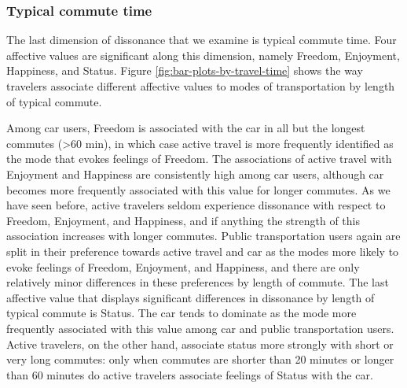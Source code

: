 \documentclass[]{elsarticle} %
\begin{document}
\hypertarget{typical-commute-time-1}{%
\subsubsection{Typical commute time}\label{typical-commute-time-1}}

The last dimension of dissonance that we examine is typical commute
time. Four affective values are significant along this dimension, namely
Freedom, Enjoyment, Happiness, and Status. Figure
\ref{fig:bar-plots-by-travel-time} shows the way travelers associate
different affective values to modes of transportation by length of
typical commute.

Among car users, Freedom is associated with the car in all but the
longest commutes (\textgreater60 min), in which case active travel is
more frequently identified as the mode that evokes feelings of Freedom.
The associations of active travel with Enjoyment and Happiness are
consistently high among car users, although car becomes more frequently
associated with this value for longer commutes. As we have seen before,
active travelers seldom experience dissonance with respect to Freedom,
Enjoyment, and Happiness, and if anything the strength of this
association increases with longer commutes. Public transportation users
again are split in their preference towards active travel and car as the
modes more likely to evoke feelings of Freedom, Enjoyment, and
Happiness, and there are only relatively minor differences in these
preferences by length of commute. The last affective value that displays
significant differences in dissonance by length of typical commute is
Status. The car tends to dominate as the mode more frequently associated
with this value among car and public transportation users. Active
travelers, on the other hand, associate status more strongly with short
or very long commutes: only when commutes are shorter than 20 minutes or
longer than 60 minutes do active travelers associate feelings of Status
with the car.
\end{document}
